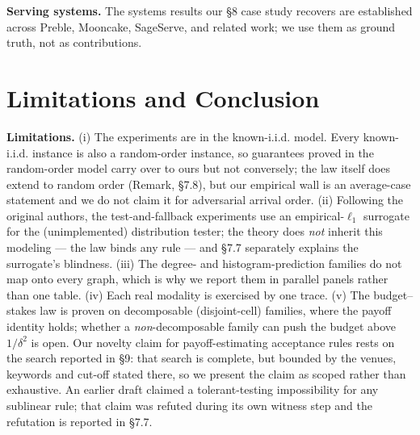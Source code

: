 \textbf{Serving systems.} The systems results our §8 case study recovers
are established across Preble, Mooncake, SageServe, and related work; we
use them as ground truth, not as contributions.

\section{Limitations and Conclusion}

\textbf{Limitations.} (i) The experiments are in the known-i.i.d. model.
Every known-i.i.d. instance is also a random-order instance, so
guarantees proved in the random-order model carry over to ours but not
conversely; the law itself does extend to random order (Remark, §7.8),
but our empirical wall is an average-case statement and we do not claim
it for adversarial arrival order. (ii) Following the original authors,
the test-and-fallback experiments use an empirical-\(\ell_1\) surrogate
for the (unimplemented) distribution tester; the theory does \emph{not}
inherit this modeling --- the law binds any rule --- and §7.7 separately
explains the surrogate's blindness. (iii) The degree- and
histogram-prediction families do not map onto every graph, which is why
we report them in parallel panels rather than one table. (iv) Each real
modality is exercised by one trace. (v) The budget--stakes law is proven
on decomposable (disjoint-cell) families, where the payoff identity
holds; whether a \emph{non}-decomposable family can push the budget
above \(1/\delta^2\) is open. Our novelty claim for payoff-estimating
acceptance rules rests on the search reported in §9: that search is
complete, but bounded by the venues, keywords and cut-off stated there,
so we present the claim as scoped rather than exhaustive. An earlier
draft claimed a tolerant-testing impossibility for any sublinear rule;
that claim was refuted during its own witness step and the refutation is
reported in §7.7.

